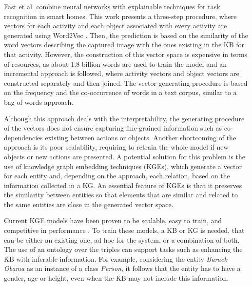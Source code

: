 Fast et al. \citep{fastetal} combine neural networks with explainable techniques for task recognition in smart homes. This work presents a three-step procedure, where vectors for each activity and each object associated with every activity are generated using Word2Vec \citep{Mikolov:2013:DRW:2999792.2999959}. Then, the prediction is based on the similarity of the word vectors describing the captured image with the ones existing in the KB for that activity. However, the construction of this vector space is expensive in terms of resources, as about 1.8 billion words are used to train the model and an incremental approach is followed, where activity vectors and object vectors are constructed separately and then joined. The vector generating procedure is based on the frequency and the co-occurrence of words in a text corpus, similar to a bag of words approach. 

Although this approach deals with the interpretability,  the generating procedure of the vectors does not ensure capturing fine-grained information such as co-dependencies existing between actions or objects. Another shortcoming of the approach is its poor scalability, requiring to retrain the whole model if new objects or new actions are presented. A potential solution for this problem is the use of knowledge graph embedding techniques (KGEs), which generate a vector for each entity and, depending on the approach, each relation, based on the information collected in a KG. An essential feature of KGEs is that it preserves the similarity between entities so that elements that are similar and related to the same entities are close in the generated vector space. %



Current KGE models have been proven to be scalable, easy to train, and competitive in performance \citep{NickelMTG15, WangMWG17}. To train these models, a KB or KG is needed, that can be either an existing one, ad hoc for the system, or a combination of both. The use of an ontology over the triples can support tasks such as enhancing the KB with inferable information.  For example, considering the entity \textit{Barack Obama} as an instance of a class \textit{Person}, it follows that the entity has to have a gender, age or height, even when the KB may not include this information.

